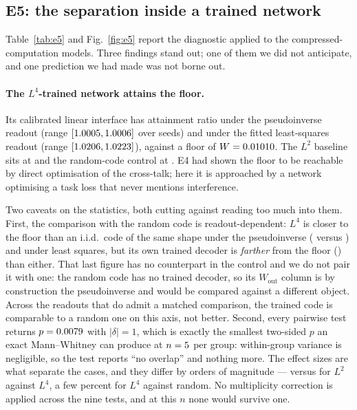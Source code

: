 \subsection{E5: the separation inside a trained network}
\label{sec:res-e5}

Table~\ref{tab:e5} and Fig.~\ref{fig:e5} report the diagnostic applied to the
compressed-computation models. Three findings stand out; one of them we did not anticipate, and
one prediction we had made was not borne out.

\paragraph{The $L^4$-trained network attains the floor.} Its calibrated linear interface has
attainment ratio \EfiveLfourRatioPinvMean{} under the pseudoinverse readout (range
$[1.0005,1.0006]$ over \EfiveSeeds{} seeds) and
\EfiveLfourRatioLsMean{} under the fitted least-squares readout (range
$[1.0206,1.0223]$), against a floor of $W=0.01010$. The
$L^2$ baseline sits at \EfiveLtwoRatioLsMean{} and the random-code control at
\EfiveRandRatioLsMean. E4 had shown the floor to be reachable by direct optimisation of the
cross-talk; here it is approached by a network optimising a task loss that never mentions
interference.

Two caveats on the statistics, both cutting against reading too much into them. First, the
comparison with the random code is readout-dependent: $L^4$ is closer to the floor than an
i.i.d.\ code of the same shape under the pseudoinverse (\EfiveLfourRatioPinvMean{} versus
\EfiveRandRatioPinvMean) and under least squares, but its own trained decoder is
\emph{farther} from the floor (\EfiveLfourRatioWoutMean) than either. That last figure has no
counterpart in the control and we do not pair it with one: the random code has no trained
decoder, so its $W_{\mathrm{out}}$ column is by construction the pseudoinverse and would be
compared against a different object. Across the readouts that do admit a matched comparison,
the trained code is comparable to a random one on this axis, not better. Second, every pairwise test returns
$p=0.0079$ with $|\delta|=1$, which is exactly the smallest two-sided $p$ an exact
Mann--Whitney can produce at $n=5$ per group: within-group variance is negligible, so
the test reports ``no overlap'' and nothing more. The effect sizes are what separate the cases,
and they differ by orders of magnitude --- \EfiveLtwoRatioLsMean{} versus
\EfiveLfourRatioLsMean{} for $L^2$ against $L^4$, a few percent for $L^4$ against random. No
multiplicity correction is applied across the nine tests, and at this $n$ none would survive
one.

